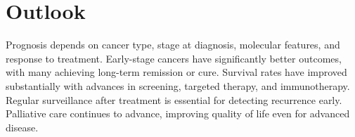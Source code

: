 \section{Outlook}
Prognosis depends on cancer type, stage at diagnosis, molecular features, and response to treatment. Early-stage cancers have significantly better outcomes, with many achieving long-term remission or cure. Survival rates have improved substantially with advances in screening, targeted therapy, and immunotherapy. Regular surveillance after treatment is essential for detecting recurrence early. Palliative care continues to advance, improving quality of life even for advanced disease.
